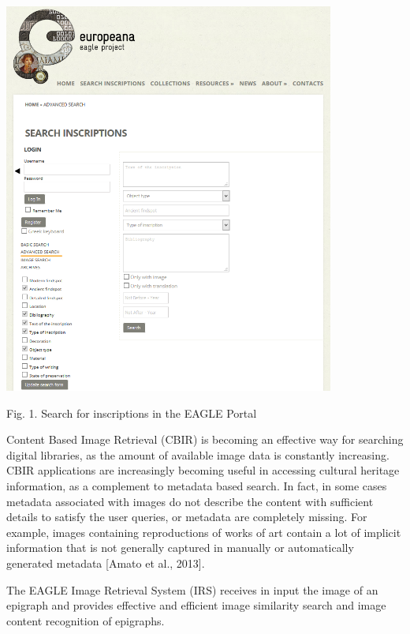 \documentclass[amsthm,ebook]{saparticle}
\begin{document}
\bigskip

 \includegraphics[width=10.874cm,height=12.885cm]{EAGLE2016submissionXX-img001.png} 

Fig. 1. Search for inscriptions in the EAGLE Portal


\bigskip

Content Based Image Retrieval (CBIR) is becoming an effective way for searching digital libraries, as the amount of
available image data is constantly increasing. CBIR applications are increasingly becoming useful in accessing cultural
heritage information, as a complement to metadata based search. In fact, in some cases metadata associated with images
do not describe the content with sufficient details to satisfy the user queries, or metadata are completely missing.
For example, images containing reproductions of works of art contain a lot of implicit information that is not
generally captured in manually or automatically generated metadata [Amato et al., 2013].

The EAGLE Image Retrieval System (IRS) receives in input the image of an epigraph and provides effective and efficient
image similarity search and image content recognition of epigraphs.


\bigskip
\end{document}
